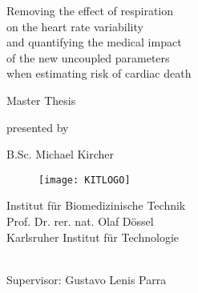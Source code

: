 \begin{titlepage}
 \parindent0cm
   \begin{center}
   \begin{bf}

\begin{minipage}[c]{15.5cm}
\begin{center}
   \begin{huge}
   \hspace{-1cm}
     Removing the effect of respiration\\
    \hspace{-1cm}
     on the heart rate variability\\
   \hspace{-1cm}
     and quantifying the medical impact\\
   \hspace{-1cm}
     of the new uncoupled parameters\\
   \hspace{-1cm}
     when estimating risk of cardiac death\\
   \end {huge}
\end{center}
\end{minipage}

    \vspace{5cm}
    {\Large Master Thesis}\\
    \end{bf}
    
    \vspace{0.5cm}
     {\large presented by}\\
    \vspace{0.5cm}
    \begin{bf}    
     {\Large B.Sc. Michael Kircher}
   \vspace{5cm}
    \end{bf}

\begin{figure}[ht]
 \centering\texttt{[image: KITLOGO]}
\end{figure}
 \begin{sc}
 Institut f\"ur Biomedizinische Technik\\
 Prof. Dr. rer. nat. Olaf D\"ossel\\
 Karlsruher Institut f\"ur Technologie\\
\the\year\\
 \end{sc}

 \vspace{0.5cm}
   Supervisor: Gustavo Lenis Parra\\
  \end{center}
\end{titlepage}

